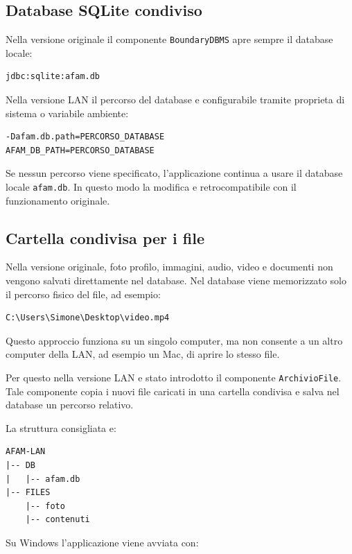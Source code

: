 \documentclass[a4paper,12pt]{article}
\begin{document}
\subsection{Database SQLite condiviso}

Nella versione originale il componente \texttt{BoundaryDBMS} apre sempre il
database locale:

\begin{verbatim}
jdbc:sqlite:afam.db
\end{verbatim}

Nella versione LAN il percorso del database e configurabile tramite proprieta di
sistema o variabile ambiente:

\begin{verbatim}
-Dafam.db.path=PERCORSO_DATABASE
AFAM_DB_PATH=PERCORSO_DATABASE
\end{verbatim}

Se nessun percorso viene specificato, l'applicazione continua a usare il database
locale \texttt{afam.db}. In questo modo la modifica e retrocompatibile con il
funzionamento originale.

\subsection{Cartella condivisa per i file}

Nella versione originale, foto profilo, immagini, audio, video e documenti non
vengono salvati direttamente nel database. Nel database viene memorizzato solo il
percorso fisico del file, ad esempio:

\begin{verbatim}
C:\Users\Simone\Desktop\video.mp4
\end{verbatim}

Questo approccio funziona su un singolo computer, ma non consente a un altro
computer della LAN, ad esempio un Mac, di aprire lo stesso file.

Per questo nella versione LAN e stato introdotto il componente
\texttt{ArchivioFile}. Tale componente copia i nuovi file caricati in una cartella
condivisa e salva nel database un percorso relativo.

La struttura consigliata e:

\begin{verbatim}
AFAM-LAN
|-- DB
|   |-- afam.db
|-- FILES
    |-- foto
    |-- contenuti
\end{verbatim}

Su Windows l'applicazione viene avviata con:
\end{document}
